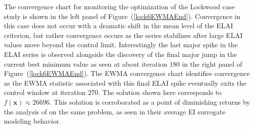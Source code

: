 \documentclass{article}
\begin{document}

%
%

%
The convergence chart for monitoring the optimization of the Lockwood case 
study is shown in the left panel of Figure~(\ref{lock6EWMAEnd}).%
Convergence in this case does 
not occur with a dramatic shift in the mean level of the ELAI criterion, but 
rather convergence occurs as the series stabilizes after large ELAI values 
move beyond the control limit. Interestingly the last major spike in the ELAI 
series is observed alongside the discovery of the final major jump in the 
current best minimum value as seen at about iteration $180$ in the right panel 
of Figure~(\ref{lock6EWMAEnd}). The EWMA convergence chart identifies 
convergence as the EWMA statistic associated with this final ELAI spike 
eventually exits the control window at iteration $270$. The solution shown here 
corresponds to $f(\bm{x})\approx26696$. %
This solution is corroborated as a point of diminishing returns 
by the analysis of \cite{gramacy2014} on the same problem, as seen in 
their average EI surrogate modeling behavior. 

\end{document}
